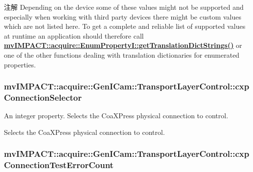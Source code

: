 \begin{DoxyNote}{注解}
Depending on the device some of these values might not be supported and especially when working with third party devices there might be custom values which are not listed here. To get a complete and reliable list of supported values at runtime an application should therefore call {\bfseries \hyperlink{classmv_i_m_p_a_c_t_1_1acquire_1_1_enum_property_i_a0ba6ccbf5ee69784d5d0b537924d26b6}{mv\+I\+M\+P\+A\+C\+T\+::acquire\+::\+Enum\+Property\+I\+::get\+Translation\+Dict\+Strings()}} or one of the other functions dealing with translation dictionaries for enumerated properties. 
\end{DoxyNote}
\hypertarget{classmv_i_m_p_a_c_t_1_1acquire_1_1_gen_i_cam_1_1_transport_layer_control_af0b16a502f5627b798794e74c1573912}{
\subsubsection[{cxp\+Connection\+Selector}]{ mv\+I\+M\+P\+A\+C\+T\+::acquire\+::\+Gen\+I\+Cam\+::\+Transport\+Layer\+Control\+::cxp\+Connection\+Selector}}\label{classmv_i_m_p_a_c_t_1_1acquire_1_1_gen_i_cam_1_1_transport_layer_control_af0b16a502f5627b798794e74c1573912}


An integer property. Selects the Coa\+X\+Press physical connection to control. 

Selects the Coa\+X\+Press physical connection to control. \hypertarget{classmv_i_m_p_a_c_t_1_1acquire_1_1_gen_i_cam_1_1_transport_layer_control_a4920160ae7c2bc5016362fc0e502b91f}{
\subsubsection[{cxp\+Connection\+Test\+Error\+Count}]{ mv\+I\+M\+P\+A\+C\+T\+::acquire\+::\+Gen\+I\+Cam\+::\+Transport\+Layer\+Control\+::cxp\+Connection\+Test\+Error\+Count}}\label{classmv_i_m_p_a_c_t_1_1acquire_1_1_gen_i_cam_1_1_transport_layer_control_a4920160ae7c2bc5016362fc0e502b91f}


